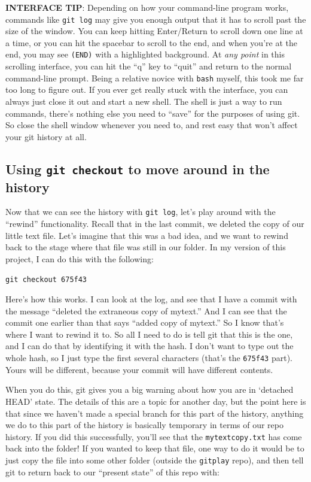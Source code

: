 \documentclass{article}
\begin{document}
\textbf{INTERFACE TIP}: Depending on how your command-line program works, commands like \texttt{git log} may give you enough output that it has to scroll past the size of the window. You can keep hitting Enter/Return to scroll down one line at a time, or you can hit the spacebar to scroll to the end, and when you're at the end, you may see \texttt{(END)} with a highlighted background. At \emph{any point} in this scrolling interface, you can hit the ``q'' key to ``quit'' and return to the normal command-line prompt.  Being a relative novice with \texttt{bash} myself, this took me far too long to figure out.  If you ever get really stuck with the interface, you can always just close it out and start a new shell. The shell is just a way to run commands, there's nothing else you need to ``save'' for the purposes of using git. So close the shell window whenever you need to, and rest easy that won't affect your git history at all.
\subsection{Using \texttt{git checkout} to move around in the history}
\label{sec-5-6}

Now that we can see the history with \texttt{git log}, let's play around with the ``rewind'' functionality. Recall that in the last commit, we deleted the copy of our little text file. Let's imagine that this was a bad idea, and we want to rewind back to the stage where that file was still in our folder. In my version of this project, I can do this with the following:


\begin{verbatim}
git checkout 675f43
\end{verbatim}

Here's how this works. I can look at the log, and see that I have a commit with the message ``deleted the extraneous copy of mytext.''  And I can see that the commit one earlier than that says ``added copy of mytext.'' So I know that's where I want to rewind it to.  So all I need to do is tell git that this is the one, and I can do that by identifying it with the hash.  I don't want to type out the whole hash, so I just type the first several characters (that's the \texttt{675f43} part).  Yours will be different, because your commit will have different contents.

When you do this, git gives you a big warning about how you are in `detached HEAD' state. The details of this are a topic for another day, but the point here is that since we haven't made a special branch for this part of the history, anything we do to this part of the history is basically temporary in terms of our repo history.  If you did this successfully, you'll see that the \texttt{mytextcopy.txt} has come back into the folder!  If you wanted to keep that file, one way to do it would be to just copy the file into some other folder (outside the \texttt{gitplay} repo), and then tell git to return back to our ``present state'' of this repo with:
\end{document}

